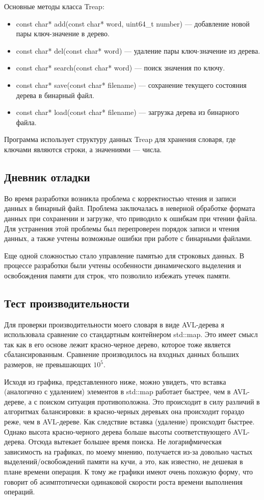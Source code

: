 \documentclass[12pt]{article}
\begin{document}
Основные методы класса Treap:

\begin{itemize}
\item const char* add(const char* word, uint64\_t number) — добавление новой пары ключ-значение в дерево.
\item const char* del(const char* word) — удаление пары ключ-значение из дерева.
\item const char* search(const char* word) — поиск значения по ключу.
\item const char* save(const char* filename) — сохранение текущего состояния дерева в бинарный файл.
\item const char* load(const char* filename) — загрузка дерева из бинарного файла.
\end{itemize}
Программа использует структуру данных Treap для хранения словаря, где ключами являются строки, а значениями — числа.

\subsection*{Дневник отладки}
Во время разработки возникла проблема с корректностью чтения и записи данных в бинарный файл. Проблема заключалась в неверной обработке формата данных при сохранении и загрузке, что приводило к ошибкам при чтении файла. Для устранения этой проблемы был перепроверен порядок записи и чтения данных, а также учтены возможные ошибки при работе с бинарными файлами.

Еще одной сложностью стало управление памятью для строковых данных. В процессе разработки были учтены особенности динамического выделения и освобождения памяти для строк, что позволило избежать утечек памяти.

\subsection*{Тест производительности}

Для проверки производительности моего словаря в виде AVL-дерева я использовала сравнение со стандартным контейнером std::map. Это имеет смысл так как в его основе лежит красно-черное дерево, которое тоже является сбалансированным.
Сравнение производилось на входных данных больших размеров, не превышающих ${10^5}$. 

Исходя из графика, представленного ниже, можно увидеть, что вставка (аналогично с удалением) элементов в std::map работает быстрее, чем в AVL-дереве, а с поиском ситуация противоположна. Это происходит в силу различий в алгоритмах балансировки: в красно-черных деревьях она происходит гораздо реже, чем в AVL-дереве. Как следствие вставка (удаление) происходит быстрее. Однако высота красно-черного дерева больше высоты соответствующего AVL-дерева. Отсюда вытекает большее время поиска.
Не логарифмическая зависимость на графиках, по моему мнению, получается из-за довольно частых выделений/освобождений памяти на кучи, а это, как известно, не дешевая в плане времени операция. К тому же графики имеют очень похожую форму, что говорит об асимптотически одинаковой скорости роста времени выполнения операций.
\end{document}
